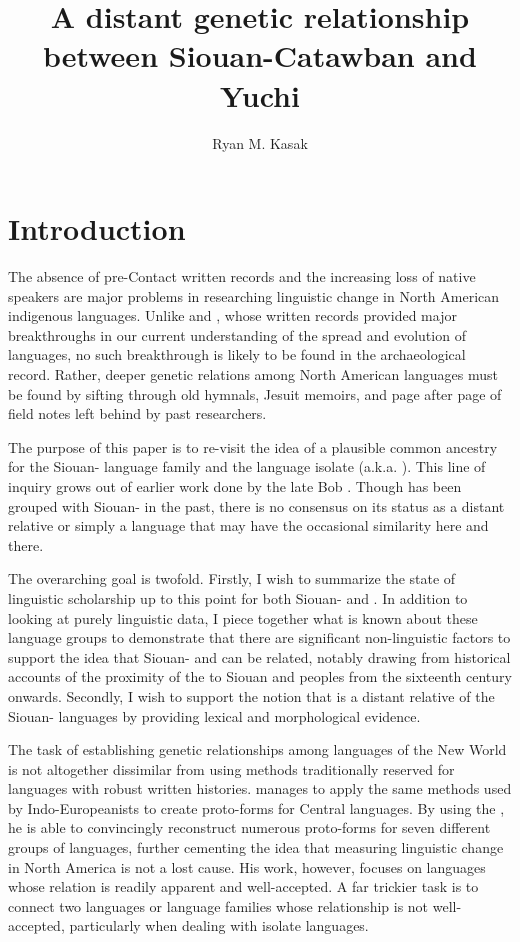 \documentclass[output=paper]{LSP/langsci}
\author{Ryan M. Kasak}
\title{A distant genetic relationship between {Siouan-Catawban} and {Yuchi}}
\begin{document}
\section{Introduction}\label{sec:kasak:1}

The absence of pre-Contact written records and the increasing loss of native speakers are major problems in researching linguistic change in North American indigenous languages. Unlike  and , whose written records provided major breakthroughs in our current understanding of the spread and evolution of  languages, no such breakthrough is likely to be found in the archaeological record. Rather, deeper genetic relations among North American languages must be found by sifting through old hymnals, Jesuit memoirs, and page after page of field notes left behind by past researchers.

The purpose of this paper is to re-visit the idea of a plausible common ancestry for the Siouan- language family and the language isolate  (a.k.a. ). This line of inquiry grows out of earlier work done by the late Bob \citet{Rankin1996,Rankin1998scy}. Though  has been grouped with Siouan- in the past, there is no consensus on its status as a distant relative or simply a language that may have the occasional similarity here and there.

The overarching goal is twofold. Firstly, I wish to summarize the state of linguistic scholarship up to this point for both Siouan- and . In addition to looking at purely linguistic data, I piece together what is known about these language groups to demonstrate that there are significant non-linguistic factors to support the idea that Siouan- and  can be related, notably drawing from historical accounts of the proximity of the  to Siouan and  peoples from the sixteenth century onwards. Secondly, I wish to support the notion that  is a distant relative of the Siouan- languages by providing lexical and morphological evidence.

The task of establishing genetic relationships among languages of the New World is not altogether dissimilar from using methods traditionally reserved for languages with robust written histories. \citet{Bloomfield1925} manages to apply the same methods used by Indo-Europeanists to create proto-forms for Central  languages. By using the , he is able to convincingly reconstruct numerous proto-forms for seven different groups of  languages, further cementing the idea that measuring linguistic change in North America is not a lost cause. His work, however, focuses on languages whose relation is readily apparent and well-accepted. A far trickier task is to connect two languages or language families whose relationship is not well-accepted, particularly when dealing with isolate languages. 
\end{document}
